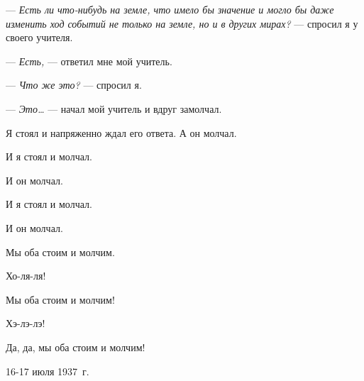--- \textit{Есть ли что-нибудь на земле, что имело бы значение и могло бы даже изменить ход событий не только на земле, но и в других мирах?} — спросил я у своего учителя.

--- \textit{Есть,} — ответил мне мой учитель.

--- \textit{Что же это?} — спросил я.

--- \textit{Это\dots{}} — начал мой учитель и вдруг замолчал.

Я стоял и напряженно ждал его ответа. А он молчал.

И я стоял и молчал.

И он молчал.

И я стоял и молчал.

И он молчал.

Мы оба стоим и молчим.

Хо-ля-ля!

Мы оба стоим и молчим!

Хэ-лэ-лэ!

Да, да, мы оба стоим и молчим!

\begin{flushright}
16-17 июля 1937~г.
\end{flushright}